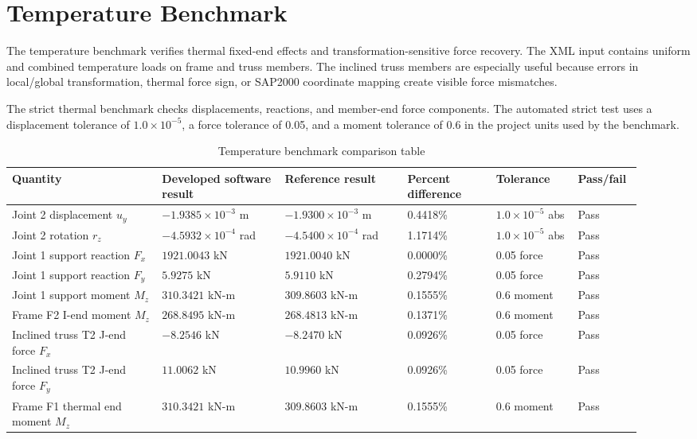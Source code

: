 \documentclass[11pt,a4paper]{article}
\begin{document}
\section{Temperature Benchmark}

The temperature benchmark verifies thermal fixed-end effects and transformation-sensitive force recovery. The XML input contains uniform and combined temperature loads on frame and truss members. The inclined truss members are especially useful because errors in local/global transformation, thermal force sign, or SAP2000 coordinate mapping create visible force mismatches.

The strict thermal benchmark checks displacements, reactions, and member-end force components. The automated strict test uses a displacement tolerance of \(1.0\times10^{-5}\), a force tolerance of 0.05, and a moment tolerance of 0.6 in the project units used by the benchmark.

\begin{table}[htbp]
\centering
\caption{Temperature benchmark comparison table}
\begin{tabular}{L{0.22\linewidth}L{0.18\linewidth}L{0.18\linewidth}L{0.13\linewidth}L{0.12\linewidth}L{0.09\linewidth}}
\toprule
Quantity & Developed software result & Reference result & Percent difference & Tolerance & Pass/fail \\
\midrule
Joint 2 displacement \(u_y\) & \(-1.9385\times10^{-3}\) m & \(-1.9300\times10^{-3}\) m & 0.4418\% & \(1.0\times10^{-5}\) abs & Pass \\
Joint 2 rotation \(r_z\) & \(-4.5932\times10^{-4}\) rad & \(-4.5400\times10^{-4}\) rad & 1.1714\% & \(1.0\times10^{-5}\) abs & Pass \\
Joint 1 support reaction \(F_x\) & \(1921.0043\) kN & \(1921.0040\) kN & 0.0000\% & 0.05 force & Pass \\
Joint 1 support reaction \(F_y\) & \(5.9275\) kN & \(5.9110\) kN & 0.2794\% & 0.05 force & Pass \\
Joint 1 support moment \(M_z\) & \(310.3421\) kN-m & \(309.8603\) kN-m & 0.1555\% & 0.6 moment & Pass \\
Frame F2 I-end moment \(M_z\) & \(268.8495\) kN-m & \(268.4813\) kN-m & 0.1371\% & 0.6 moment & Pass \\
Inclined truss T2 J-end force \(F_x\) & \(-8.2546\) kN & \(-8.2470\) kN & 0.0926\% & 0.05 force & Pass \\
Inclined truss T2 J-end force \(F_y\) & \(11.0062\) kN & \(10.9960\) kN & 0.0926\% & 0.05 force & Pass \\
Frame F1 thermal end moment \(M_z\) & \(310.3421\) kN-m & \(309.8603\) kN-m & 0.1555\% & 0.6 moment & Pass \\
\bottomrule
\end{tabular}
\end{table}
\end{document}
